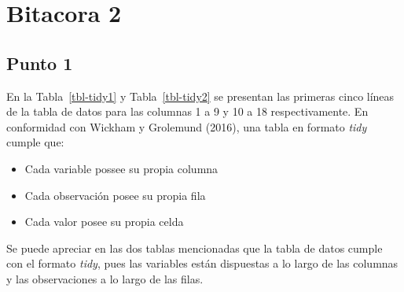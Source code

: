 \documentclass[
  letterpaper,
  onepage,
  openany]{report}
\renewcommand*\tablename{Tabla}
\newcommand\tablename{Tabla}
\begin{document}

\hypertarget{bitacora-2}{%
\chapter{Bitacora 2}\label{bitacora-2}}

\renewcommand\tablename{Tabla}

\hypertarget{punto-1}{%
\section{Punto 1}\label{punto-1}}

En la Tabla~\ref{tbl-tidy1} y Tabla~\ref{tbl-tidy2} se presentan las
primeras cinco líneas de la tabla de datos para las columnas 1 a 9 y 10
a 18 respectivamente. En conformidad con Wickham y Grolemund (2016), una
tabla en formato \emph{tidy} cumple que:

\begin{itemize}
\item
  Cada variable possee su propia columna
\item
  Cada observación posee su propia fila
\item
  Cada valor posee su propia celda
\end{itemize}

Se puede apreciar en las dos tablas mencionadas que la tabla de datos
cumple con el formato \emph{tidy}, pues las variables están dispuestas a
lo largo de las columnas y las observaciones a lo largo de las filas.
\end{document}
